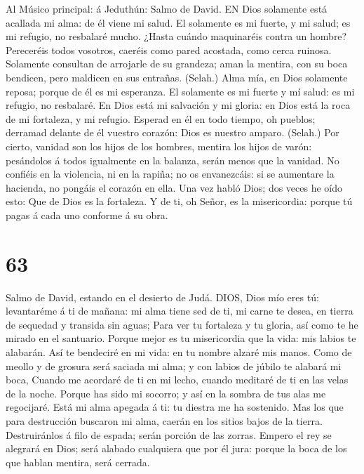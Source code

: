 Al Músico principal: á Jeduthún: Salmo de David. EN Dios
solamente está acallada mi alma: de él viene mi salud.  El
solamente es mi fuerte, y mi salud; es mi refugio, no resbalaré mucho.
 ¿Hasta cuándo maquinaréis contra un hombre? Pereceréis
todos vosotros, caeréis como pared acostada, como cerca ruinosa.
 Solamente consultan de arrojarle de su grandeza; aman la
mentira, con su boca bendicen, pero maldicen en sus entrañas. (Selah.)
 Alma mía, en Dios solamente reposa; porque de él es mi
esperanza.  El solamente es mi fuerte y mí salud: es mi
refugio, no resbalaré.  En Dios está mi salvación y mi
gloria: en Dios está la roca de mi fortaleza, y mi refugio. 
Esperad en él en todo tiempo, oh pueblos; derramad delante de él vuestro
corazón: Dios es nuestro amparo. (Selah.)  Por cierto,
vanidad son los hijos de los hombres, mentira los hijos de varón:
pesándolos á todos igualmente en la balanza, serán menos que la vanidad.
 No confiéis en la violencia, ni en la rapiña; no os
envanezcáis: si se aumentare la hacienda, no pongáis el corazón en ella.
 Una vez habló Dios; dos veces he oído esto: Que de Dios es
la fortaleza.  Y de ti, oh Señor, es la misericordia:
porque tú pagas á cada uno conforme á su obra.

\hypertarget{section-62}{%
\section{63}\label{section-62}}

 Salmo de David, estando en el desierto de Judá. DIOS, Dios
mío eres tú: levantaréme á ti de mañana: mi alma tiene sed de ti, mi
carne te desea, en tierra de sequedad y transida sin aguas; 
Para ver tu fortaleza y tu gloria, así como te he mirado en el
santuario.  Porque mejor es tu misericordia que la vida: mis
labios te alabarán.  Así te bendeciré en mi vida: en tu
nombre alzaré mis manos.  Como de meollo y de grosura será
saciada mi alma; y con labios de júbilo te alabará mi boca, 
Cuando me acordaré de ti en mi lecho, cuando meditaré de ti en las velas
de la noche.  Porque has sido mi socorro; y así en la sombra
de tus alas me regocijaré.  Está mi alma apegada á ti: tu
diestra me ha sostenido.  Mas los que para destrucción
buscaron mi alma, caerán en los sitios bajos de la tierra. 
Destruiránlos á filo de espada; serán porción de las zorras.
 Empero el rey se alegrará en Dios; será alabado cualquiera
que por él jura: porque la boca de los que hablan mentira, será cerrada.

